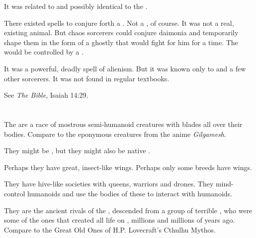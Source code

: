 It was related to and possibly identical to the . 

There existed spells to conjure forth a \malgryph.
Not a  \malgryph, of course. 
It was not a real, existing animal.
But chaos sorcerers could conjure daimonia and temporarily shape them in the form of a ghostly \malgryph that would fight for him for a time.
The \malgryph would be controlled by a \homunculus. 

It was a powerful, deadly spell of alienism.
But it was known only to \dragons and a few other sorcerers.
It was not found in regular \rethyactic textbooks.

See \emph{The Bible}, Isaiah 14:29.















\section{\NerasKirishgaith}
The \NerasKirishgaith{} are a race of mostrous semi-humanoid creatures with blades all over their bodies. Compare to the eponymous creatures from the anime \emph{Gilgamesh}. 

They might be \banes, but they might also be native \Miithians. 

Perhaps they have great, insect-like wings. Perhaps only some breeds have wings. 

They have hive-like societies with queens, warriors and drones. They mind-control humanoids and use the bodies of these to interact with humanoids. 

They are the ancient rivals of the \ophidians, descended from a group of terrible , who were some of the ones that created all life on \Miith{}, millions and millions of years ago. Compare to the Great Old Ones of H.P. Lovecraft's Cthulhu Mythos.















